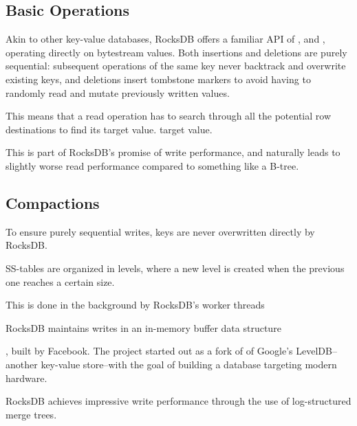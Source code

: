\subsection{Basic Operations}
Akin to other key-value databases, RocksDB offers a familiar API of
,  and , operating
directly on bytestream values. Both insertions and deletions are purely
sequential: subsequent  operations of the same key never backtrack and
overwrite existing keys, and deletions insert tombstone markers to avoid having
to randomly read and mutate previously written values.

This means that a read operation has to search through all the potential row
destinations to find its target value.
target value.


This is part of RocksDB's
promise of write performance, and naturally leads to slightly worse read
performance compared to something like a B-tree.



\subsection{Compactions}
To ensure purely sequential writes, keys are never overwritten directly by
RocksDB.

SS-tables are organized in levels, where a new level is created when the
previous one reaches a certain size.

This is done in the background by RocksDB's
worker threads




RocksDB maintains writes in an in-memory buffer data structure

, built
by Facebook. The project started out as a fork of of Google's LevelDB--another
key-value store--with the goal of building a database targeting modern hardware.

RocksDB achieves impressive write performance through the use of log-structured
merge trees.

